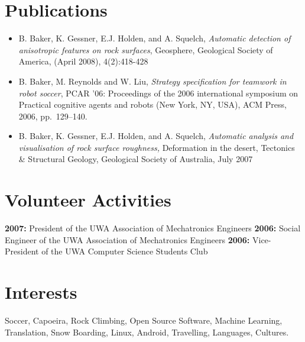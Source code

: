 \documentclass[10pt, a4paper]{report}
\begin{document}
\vfill

\section*{Publications}
\begin{itemize}
\item B. Baker, K. Gessner, E.J. Holden, and A. Squelch,  \emph{Automatic detection of anisotropic features on
rock surfaces}, Geosphere, Geological Society of America, (April 2008), 4(2):418-428
\item B. Baker, M. Reynolds and W. Liu, \emph{Strategy specification for
  teamwork in robot soccer}, PCAR '06: Proceedings of the 2006 international
  symposium on Practical cognitive agents and robots (New York, NY, USA), ACM
  Press, 2006, pp.~129--140.
\item B. Baker, K. Gessner, E.J. Holden, and A. Squelch, \emph{Automatic analysis and 
visualisation of rock surface roughness,} Deformation in the desert, Tectonics \& Structural Geology, Geological Society of Australia, July 
2007
\end{itemize}

%


\vfill

\section*{Volunteer Activities}
{\bf 2007:} President of the UWA Association of Mechatronics Engineers \newline
{\bf 2006:} Social Engineer of the UWA Association of Mechatronics Engineers \newline
{\bf 2006:} Vice-President of the UWA Computer Science Students Club \newline


\vfill

\section*{Interests}
{ Soccer, Capoeira, Rock Climbing, Open Source Software, Machine Learning, Translation, Snow Boarding, Linux, Android, Travelling, Languages, Cultures.}
\end{document}
